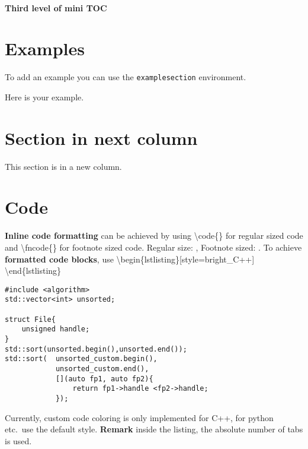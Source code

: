 \documentclass[\fontheight]{extarticle}
\begin{document}
\begin{multicols*}{3}
    \paragraph{Third level of mini TOC}
    
    \section{Examples}
    To add an example you can use the \texttt{examplesection} environment.
    \begin{examplesection}
        Here is your example.
    \end{examplesection}
    
    \newcol{}
    
    \section{Section in next column}
    This section is in a new column.
        
    \section{Code}
    \textbf{Inline code formatting} can be achieved by using \textbackslash{code}\{\} for regular sized code
    and \textbackslash{fncode}\{\} for footnote sized code.\newline
    Regular size: ,\newline
    Footnote sized: .
    \newpar{}
    To achieve \textbf{formatted code blocks}, use \newline
    \textbackslash{begin}\{lstlisting\}[style=bright\_C++]\newline
    \newline
    \textbackslash{end}\{lstlisting\}
    
    \begin{lstlisting}[style=bright_C++]
#include <algorithm>
std::vector<int> unsorted;

struct File{
    unsigned handle;
}
std::sort(unsorted.begin(),unsorted.end());
std::sort(  unsorted_custom.begin(),
            unsorted_custom.end(),
            [](auto fp1, auto fp2){
                return fp1->handle <fp2->handle;
            });
\end{lstlisting}
    
    Currently, custom code coloring is only implemented for C++, for python etc.\ use the default style.
    \newpar{}
    \textbf{Remark} inside the listing, the absolute number of tabs is used.
    
    
\end{multicols*}
\end{document}
